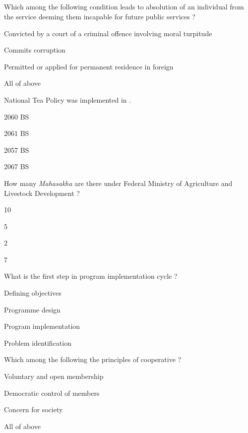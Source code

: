 
\subsection*{}

\begin{questions}

\question Which among the following condition leads to absolution of an individual from the service deeming them incapable for future public services ?
\begin{items}
\item Convicted by a court of a criminal offence involving moral turpitude
\item Commits corruption
\item Permitted or applied for permanent residence in foreign
\item* All of above
\end{items}

\question National Tea Policy was implemented in \fillin[][3cm].
\begin{items}
\item 2060 BS
\item 2061 BS
\item* 2057 BS
\item 2067 BS
\end{items}

\question How many \textit{Mahasakha} are there under Federal Ministry of Agriculture and Livestock Development ?
\begin{items}
\item 10
\item 5
\item 2
\item* 7
\end{items}

\question What is the first step in program implementation cycle ?
\begin{items}
\item Defining objectives
\item Programme design
\item Program implementation
\item* Problem identification
\end{items}

\question Which among the following the principles of cooperative ?
\begin{items}
\item Voluntary and open membership
\item Democratic control of members
\item Concern for society
\item* All of above
\end{items}


\end{questions}
